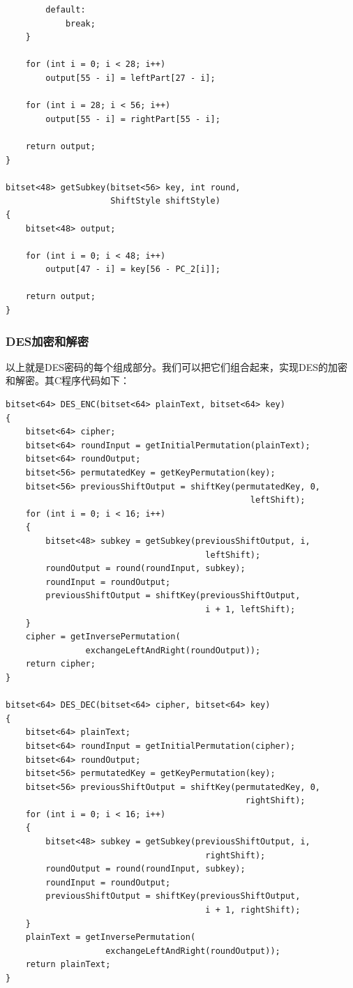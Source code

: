 \begin{prove}
\begin{verbatim}
        default:
            break;
    }

    for (int i = 0; i < 28; i++)
        output[55 - i] = leftPart[27 - i];

    for (int i = 28; i < 56; i++)
        output[55 - i] = rightPart[55 - i];

    return output;
}

bitset<48> getSubkey(bitset<56> key, int round, 
                     ShiftStyle shiftStyle)
{
    bitset<48> output;

    for (int i = 0; i < 48; i++)
        output[47 - i] = key[56 - PC_2[i]];

    return output;
}
\end{verbatim}
\end{prove}
\subsubsection{DES加密和解密}
以上就是DES密码的每个组成部分。我们可以把它们组合起来，实现DES的加密和解密。其C程序代码如下：
\begin{prove}
\begin{verbatim}
bitset<64> DES_ENC(bitset<64> plainText, bitset<64> key)
{
    bitset<64> cipher;
    bitset<64> roundInput = getInitialPermutation(plainText);
    bitset<64> roundOutput;
    bitset<56> permutatedKey = getKeyPermutation(key);
    bitset<56> previousShiftOutput = shiftKey(permutatedKey, 0,
                                                 leftShift);
    for (int i = 0; i < 16; i++)
    {
        bitset<48> subkey = getSubkey(previousShiftOutput, i, 
                                        leftShift);
        roundOutput = round(roundInput, subkey);
        roundInput = roundOutput;
        previousShiftOutput = shiftKey(previousShiftOutput, 
                                        i + 1, leftShift);
    }
    cipher = getInversePermutation(
                exchangeLeftAndRight(roundOutput));
    return cipher;
}

bitset<64> DES_DEC(bitset<64> cipher, bitset<64> key)
{
    bitset<64> plainText;
    bitset<64> roundInput = getInitialPermutation(cipher);
    bitset<64> roundOutput;
    bitset<56> permutatedKey = getKeyPermutation(key);
    bitset<56> previousShiftOutput = shiftKey(permutatedKey, 0, 
                                                rightShift);
    for (int i = 0; i < 16; i++)
    {
        bitset<48> subkey = getSubkey(previousShiftOutput, i, 
                                        rightShift);
        roundOutput = round(roundInput, subkey);
        roundInput = roundOutput;
        previousShiftOutput = shiftKey(previousShiftOutput, 
                                        i + 1, rightShift);
    }
    plainText = getInversePermutation(
                    exchangeLeftAndRight(roundOutput));
    return plainText;
}
\end{verbatim}
\end{prove}
